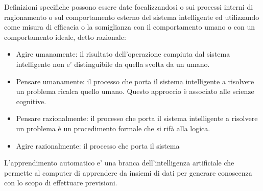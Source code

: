 Definizioni specifiche possono essere date focalizzandosi o sui processi interni di ragionamento o sul comportamento esterno del sistema intelligente ed utilizzando come misura di efficacia o la somiglianza con il comportamento umano o con un comportamento ideale, detto razionale:
\begin{itemize}
	\item Agire umanamente: il risultato dell'operazione compiuta dal sistema intelligente non e' distinguibile da quella svolta da un umano.
	\item Pensare umanamente: il processo che porta il sistema intelligente a risolvere un problema ricalca quello umano. Questo approccio è associato alle scienze cognitive.
	\item Pensare razionalmente: il processo che porta il sistema intelligente a risolvere un problema è un procedimento formale che si rifà alla logica.
	\item Agire razionalmente: il processo che porta il sistema
\end{itemize} 
L'apprendimento automatico e' una branca dell'intelligenza artificiale che permette al computer di apprendere da insiemi di dati per generare conoscenza con lo scopo di effettuare previsioni.

